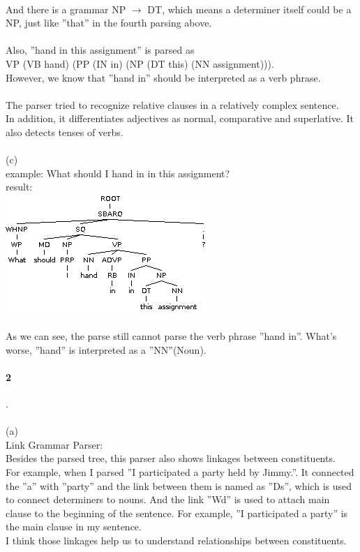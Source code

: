 \documentclass[11pt]{article}
\begin{document}
\\
And there is a grammar NP $\rightarrow$ DT, which means a determiner itself could be a NP, just like ''that'' in the fourth parsing above.\\
\\
Also, ''hand in this assignment'' is parsed as \\
VP (VB hand)
      (PP (IN in)
            (NP (DT this) (NN assignment))).\\
However, we know that ''hand in'' should be interpreted as a verb phrase.\\
\\
The parser tried to recognize relative clauses in a relatively complex sentence.\\
In addition, it differentiates adjectives as normal, comparative and superlative. It also detects tenses of verbs.\\
\\
(c)\\
example:  What should I hand in in this assignment?\\
result:\\
\includegraphics[width=0.8\linewidth]{parse5.png}\\
\\
As we can see, the parse still cannot parse the verb phrase ''hand in''. What's worse, ''hand'' is interpreted as a ''NN''(Noun).\\
\paragraph{2}. \\
\\
(a)\\
Link Grammar Parser:\\
Besides the parsed tree, this parser also shows linkages between constituents.\\
For example, when I parsed ''I participated a party held by Jimmy.''. It connected the ''a'' with ''party'' and the link between them is named as ''Ds'', which is used to connect determiners to nouns. And the link ''Wd'' is used to attach main clause to the beginning of the sentence. For example, ''I participated a party'' is the main clause in my sentence.\\
I think those linkages help us to understand relationships between constituents.\\
 
\end{document}
